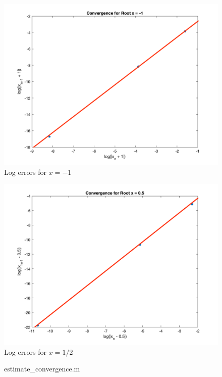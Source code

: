 \documentclass[11pt]{article}
\begin{document}
\begin{figure}[h!]
  \centering
  \includegraphics[width=0.8\linewidth]{newton_root_1_fit.png}
  \caption{Log errors for $x = -1$}
  \label{fig:newton_root_1_fit}
\end{figure}

\begin{figure}[h!]
  \centering
  \includegraphics[width=0.8\linewidth]{newton_root_2_fit.png}
  \caption{Log errors for $x = 1/2$}
  \label{fig:newton_root_2_fit}
\end{figure}


\begin{figure}[h!]
  \centering
  
  \caption{estimate\_convergence.m}
  \label{fig:estimateconvergence.m}
\end{figure}
  
\end{document}
